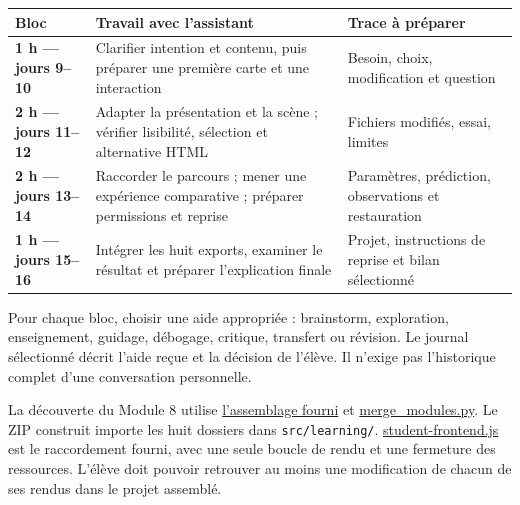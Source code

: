 \documentclass[
  canadien,
  11pt,
  a4paper,
]{report}
\newcounter{none} %
\begin{document}
{\def\LTcaptype{none} %
\begin{longtable}[]{@{}
  >{\raggedright\arraybackslash}p{}
  >{\raggedright\arraybackslash}p{}
  >{\raggedright\arraybackslash}p{}@{}}
\toprule\noalign{}
\begin{minipage}[b]{\linewidth}\raggedright
Bloc
\end{minipage} & \begin{minipage}[b]{\linewidth}\raggedright
Travail avec l'assistant
\end{minipage} & \begin{minipage}[b]{\linewidth}\raggedright
Trace à préparer
\end{minipage} \\
\midrule\noalign{}
\endhead
\bottomrule\noalign{}
\endlastfoot
\textbf{1 h --- jours 9--10} & Clarifier intention et contenu, puis
préparer une première carte et une interaction & Besoin, choix,
modification et question \\
\textbf{2 h --- jours 11--12} & Adapter la présentation et la scène ;
vérifier lisibilité, sélection et alternative HTML & Fichiers modifiés,
essai, limites \\
\textbf{2 h --- jours 13--14} & Raccorder le parcours ; mener une
expérience comparative ; préparer permissions et reprise & Paramètres,
prédiction, observations et restauration \\
\textbf{1 h --- jours 15--16} & Intégrer les huit exports, examiner le
résultat et préparer l'explication finale & Projet, instructions de
reprise et bilan sélectionné \\
\end{longtable}
}

Pour chaque bloc, choisir une aide appropriée : brainstorm, exploration,
enseignement, guidage, débogage, critique, transfert ou révision. Le
journal sélectionné décrit l'aide reçue et la décision de l'élève. Il
n'exige pas l'historique complet d'une conversation personnelle.

La découverte du Module 8 utilise
\href{../../assembly/README.md}{l'assemblage fourni} et
\href{../../assembly/merge_modules.py}{merge\_modules.py}. Le ZIP
construit importe les huit dossiers dans \texttt{src/\allowbreak{}learning/\allowbreak{}}.
\href{../../assembly/src/student-frontend.js}{student-frontend.js} est
le raccordement fourni, avec une seule boucle de rendu et une fermeture
des ressources. L'élève doit pouvoir retrouver au moins une modification
de chacun de ses rendus dans le projet assemblé.
\end{document}
